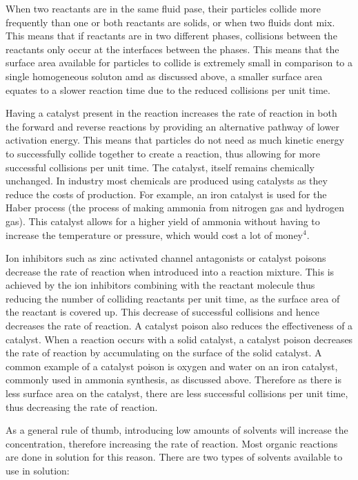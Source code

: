 When two reactants are in the same fluid pase, their particles collide more frequently than one or both reactants are solids, or when two fluids dont mix. This means that if reactants are in two different phases, collisions between the reactants only occur at the interfaces between the phases. This means that the surface area available for particles to collide is extremely small in comparison to a single homogeneous soluton amd as discussed above, a smaller surface area equates to a slower reaction time due to the reduced collisions per unit time.

Having a catalyst present in the reaction increases the rate of reaction in both the forward and reverse reactions by providing an alternative pathway of lower activation energy. This means that particles do not need as much kinetic energy to successfully collide together to create a reaction, thus allowing for more successful collisions per unit time. The catalyst, itself remains chemically unchanged. In industry most chemicals are produced using catalysts as they reduce the costs of production. For example, an iron catalyst is used for the Haber process (the process of making ammonia from nitrogen gas and hydrogen gas). This catalyst allows for a higher yield of ammonia without having to increase the temperature or pressure, which would cost a lot of money$^4$.

Ion inhibitors such as zinc activated channel antagonists or catalyst poisons decrease the rate of reaction when introduced into a reaction mixture. This is achieved by the ion inhibitors combining with the reactant molecule thus reducing the number of colliding reactants per unit time, as the surface area of the reactant is covered up. This decrease of successful collisions and hence decreases the rate of reaction. A catalyst poison also reduces the effectiveness of a catalyst. When a reaction occurs with a solid catalyst, a catalyst poison decreases the rate of reaction by accumulating on the surface of the solid catalyst. A common example of a catalyst poison is oxygen and water on an iron catalyst, commonly used in ammonia synthesis, as discussed above. Therefore as there is less surface area on the catalyst, there are less successful collisions per unit time, thus decreasing the rate of reaction.

As a general rule of thumb, introducing low amounts of solvents will increase the concentration, therefore increasing the rate of reaction. Most organic reactions are done in solution for this reason. There are two types of solvents available to use in solution:

